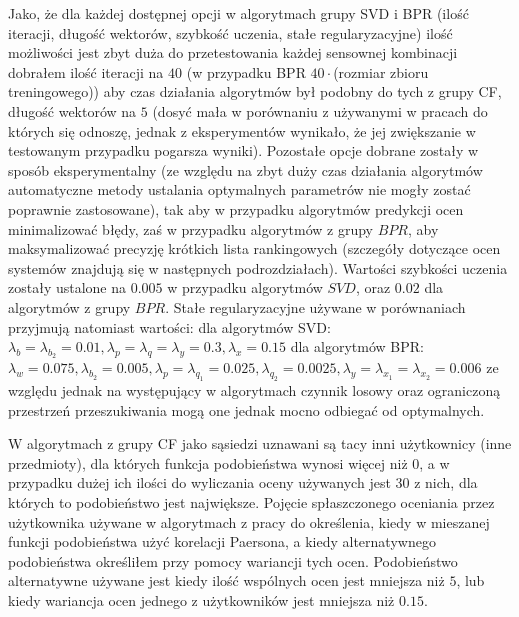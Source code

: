 \documentclass{pracamgr}
\begin{document}
   Jako, że dla każdej dostępnej opcji w algorytmach grupy SVD i BPR (ilość iteracji, długość wektorów, szybkość uczenia, stałe regularyzacyjne)
   ilość możliwości jest zbyt duża do przetestowania każdej sensownej kombinacji dobrałem ilość iteracji na $40$
   (w przypadku BPR $40\cdot$(rozmiar zbioru treningowego)) aby czas działania algorytmów był podobny do tych z grupy CF, długość wektorów na $5$
   (dosyć mała w porównaniu z używanymi w pracach do których się odnoszę, jednak z eksperymentów wynikało, że jej zwiększanie w testowanym przypadku
   pogarsza wyniki). Pozostałe opcje dobrane zostały w sposób eksperymentalny
   (ze względu na zbyt duży czas działania algorytmów automatyczne metody ustalania optymalnych parametrów nie mogły zostać poprawnie zastosowane),
   tak aby w przypadku algorytmów predykcji ocen minimalizować błędy, zaś w przypadku algorytmów z grupy $BPR$, aby maksymalizować precyzję
   krótkich lista rankingowych (szczegóły dotyczące ocen systemów znajdują się w następnych podrozdziałach).
   Wartości szybkości uczenia zostały ustalone na $0.005$ w przypadku algorytmów $SVD$, oraz $0.02$ dla algorytmów z grupy $BPR$.
   Stałe regularyzacyjne używane w porównaniach przyjmują natomiast wartości:\newline
   dla algorytmów SVD:\newline
   $\lambda_b=\lambda_{b_2}=0.01,\lambda_p=\lambda_q=\lambda_y=0.3,\lambda_x=0.15$\newline
   dla algorytmów BPR:\newline
   $\lambda_w=0.075,\lambda_{b_2}=0.005,\lambda_p=\lambda_{q_1}=0.025,\lambda_{q_2}=0.0025,\lambda_y=\lambda_{x_1}=\lambda_{x_2}=0.006$\newline
   ze względu jednak na występujący w algorytmach czynnik losowy oraz ograniczoną przestrzeń przeszukiwania mogą one jednak mocno odbiegać od optymalnych.
   
   W algorytmach z grupy CF jako sąsiedzi uznawani są tacy inni użytkownicy (inne przedmioty), dla których funkcja podobieństwa wynosi więcej niż $0$,
   a w przypadku dużej ich ilości do wyliczania oceny używanych jest $30$ z nich, dla których to podobieństwo jest największe. 
   Pojęcie spłaszczonego oceniania przez użytkownika używane w algorytmach z pracy \cite{221} do określenia,
   kiedy w mieszanej funkcji podobieństwa użyć korelacji Paersona, a kiedy alternatywnego podobieństwa określiłem przy pomocy wariancji tych ocen.
   Podobieństwo alternatywne używane jest kiedy ilość wspólnych ocen jest mniejsza niż $5$, lub kiedy wariancja ocen jednego z użytkowników jest mniejsza niż $0.15$.\newline
\end{document}
